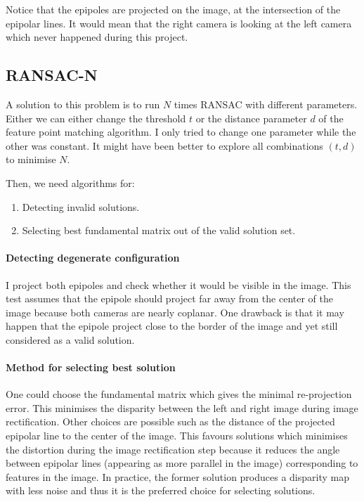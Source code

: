 \documentclass[11pt]{report}
\begin{document}
Notice that the epipoles are projected on the image, at the intersection of the epipolar lines. It would mean that the right camera is looking at the left camera which never happened during this project.

\subsection{RANSAC-N}

A solution to this problem is to run $N$ times RANSAC with different parameters. Either we can either change the threshold $t$ or the distance parameter $d$ of the feature point matching algorithm. I only tried to change one parameter while the other was constant. It might have been better to explore all combinations $(t, d)$ to minimise $N$.

Then, we need algorithms for:
\begin{enumerate}
    \item Detecting invalid solutions.
    \item Selecting best fundamental matrix out of the valid solution set.
\end{enumerate}

\paragraph{Detecting degenerate configuration} I project both epipoles and check whether it would be visible in the image. This test assumes that the epipole should project far away from the center of the image because both cameras are nearly coplanar. One drawback is that it may happen that the epipole project close to the border of the image and yet still considered as a valid solution.

\paragraph{Method for selecting best solution} One could choose the fundamental matrix which gives the minimal re-projection error. This minimises the disparity between the left and right image during image rectification. Other choices are possible such as the distance of the projected epipolar line to the center of the image. This favours solutions which minimises the distortion during the image rectification step because it reduces the angle between epipolar lines (appearing as more parallel in the image) corresponding to features in the image. In practice, the former solution produces a disparity map with less noise and thus it is the preferred choice for selecting solutions.
\end{document}
